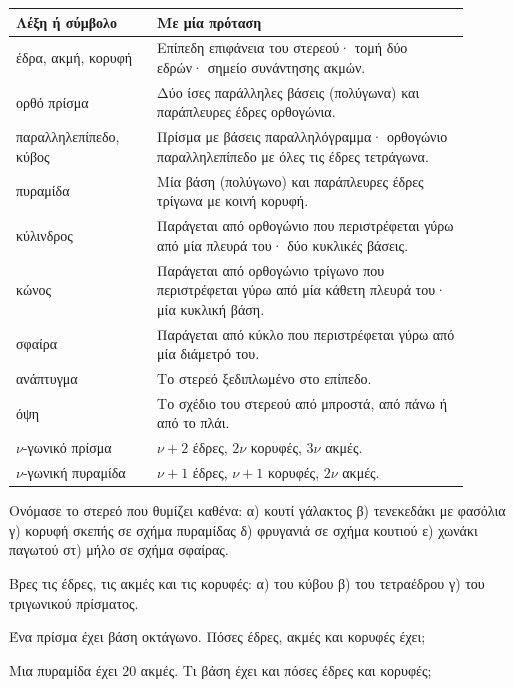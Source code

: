 

\renewcommand{\arraystretch}{1.5}
\begin{longtable}{@{}>{\raggedright\arraybackslash}p{0.28\linewidth} >{\raggedright\arraybackslash}p{0.62\linewidth}@{}}
\toprule
\textbf{Λέξη ή σύμβολο} & \textbf{Με μία πρόταση}\\
\midrule
\endhead
έδρα, ακμή, κορυφή & Επίπεδη επιφάνεια του στερεού· τομή δύο εδρών· σημείο συνάντησης ακμών.\\
ορθό πρίσμα & Δύο ίσες παράλληλες βάσεις (πολύγωνα) και παράπλευρες έδρες ορθογώνια.\\
παραλληλεπίπεδο, κύβος & Πρίσμα με βάσεις παραλληλόγραμμα· ορθογώνιο παραλληλεπίπεδο με όλες τις έδρες τετράγωνα.\\
πυραμίδα & Μία βάση (πολύγωνο) και παράπλευρες έδρες τρίγωνα με κοινή κορυφή.\\
κύλινδρος & Παράγεται από ορθογώνιο που περιστρέφεται γύρω από μία πλευρά του· δύο κυκλικές βάσεις.\\
κώνος & Παράγεται από ορθογώνιο τρίγωνο που περιστρέφεται γύρω από μία κάθετη πλευρά του· μία κυκλική βάση.\\
σφαίρα & Παράγεται από κύκλο που περιστρέφεται γύρω από μία διάμετρό του.\\
ανάπτυγμα & Το στερεό ξεδιπλωμένο στο επίπεδο.\\
όψη & Το σχέδιο του στερεού από μπροστά, από πάνω ή από το πλάι.\\
$\nu$-γωνικό πρίσμα & $\nu+2$ έδρες, $2\nu$ κορυφές, $3\nu$ ακμές.\\
$\nu$-γωνική πυραμίδα & $\nu+1$ έδρες, $\nu+1$ κορυφές, $2\nu$ ακμές.\\
\bottomrule
\end{longtable}


\ex Ονόμασε το στερεό που θυμίζει καθένα: α) κουτί γάλακτος \quad β) τενεκεδάκι με φασόλια \quad γ) κορυφή σκεπής σε σχήμα πυραμίδας \quad δ) φρυγανιά σε σχήμα κουτιού \quad ε) χωνάκι παγωτού \quad στ) μήλο σε σχήμα σφαίρας.

\ex Βρες τις έδρες, τις ακμές και τις κορυφές: α) του κύβου \quad β) του τετραέδρου \quad γ) του τριγωνικού πρίσματος.

\ex Ένα πρίσμα έχει βάση οκτάγωνο. Πόσες έδρες, ακμές και κορυφές έχει;

\ex Μια πυραμίδα έχει $20$ ακμές. Τι βάση έχει και πόσες έδρες και κορυφές;


